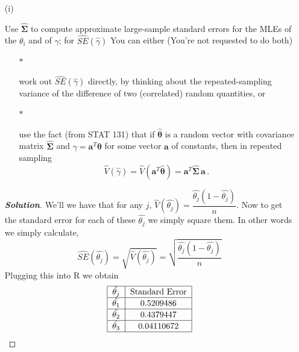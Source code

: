 \documentclass[12pt]{article}
\newenvironment{solution}{\begin{tcolorbox}[breakable]\begin{proof}[\textbf{\textit{Solution}}] }{\end{proof}\end{tcolorbox}}
\begin{document}
\begin{itemize}
\begin{itemize}
\begin{itemize}
\item[(i)]

Use $\hat{ \bm{ \Sigma } }$ to compute approximate large-sample standard errors for the MLEs of the $\theta_i$ and of $\gamma$; for $\widehat{ SE } \! \left( \hat{ \gamma } \right)$ You can either (You're not requested to do both)

\begin{itemize}

\item[$*$]

work out $\widehat{ SE } \! \left( \hat{ \gamma } \right)$ directly, by thinking about the repeated-sampling variance of the difference of two (correlated) random quantities, or 

\item[$*$]

use the fact (from STAT 131) that if $\hat{ \bm{ \theta } }$ is a random vector with covariance matrix $\hat{ \bm{ \Sigma } }$ and $\gamma = \bm{ a }^T \bm{ \theta }$ for some vector $\bm{ a }$ of constants, then in repeated sampling
\begin{equation} \label{e:multinomial-11}
\hat{ V } \! \left( \hat{ \gamma } \right) = \hat{ V } \! \left( \bm{ a }^T \hat{ \bm{ \theta } } \right) = \bm{ a }^T \hat{ \bm{ \Sigma } } \, \bm{ a } \, .
\end{equation}

\end{itemize}
\textit{\fbox{\textbf{[5 points]}}} 
\begin{solution}
    We'll we have that for any $j$, $\hat{V}(\hat{\theta_j}) = \dfrac{\hat{\theta_j}(1 - \hat{\theta_j})}{n}$. Now to get the standard error for each of these $\hat{\theta_j}$ we simply square them. In other words we simply calculate,
    \[\widehat{SE}(\hat{\theta_j}) = \sqrt{\hat{V}(\hat{\theta_j})} = \sqrt{\dfrac{\hat{\theta_j}(1 - \hat{\theta_j})}{n}}\]
    Plugging this into R we obtain
    \renewcommand{\arraystretch}{1.5}
    \begin{align*}
        \begin{tabular}{| c | c | }
            \hline
            $\hat{\theta_j}$ & Standard Error \\
            \hline
            $\hat{\theta_1}$ & 0.5209486\\
            \hline
            $\hat{\theta_2}$ & 0.4379447\\
            \hline
            $\hat{\theta_3}$ & 0.04110672 \\
            \hline
        \end{tabular}
    \end{align*}


\end{solution}
\end{itemize}
\end{itemize}
\end{itemize}
\end{document}
